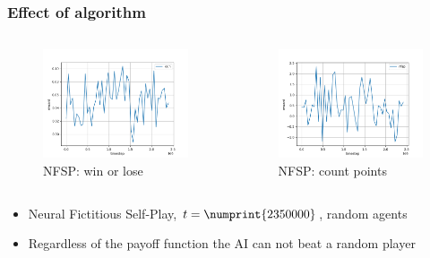 \begin{frame}
\frametitle{Effect of algorithm}

\begin{columns}

\begin{column}[t]{.5\textwidth}
\begin{figure}
\includegraphics[width=\textwidth]{nfsp.png}
\caption{NFSP: win or lose}
\end{figure}
\end{column}

\begin{column}[t]{.5\textwidth}
\begin{figure}
\includegraphics[width=\textwidth]{nfsp-custom-payoff.png}
\caption{NFSP: count points}
\end{figure}
\end{column}

\end{columns}

\begin{itemize}
\item Neural Fictitious Self-Play, $t = \numprint{2350000}$, random agents
\item Regardless of the payoff function the AI can not beat a random player

\end{itemize}
\end{frame}

